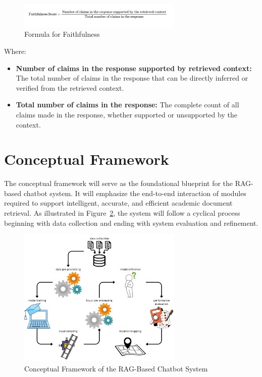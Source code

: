 \begin{refsection}

\begin{figure}[H]
\centering
\includegraphics[width=0.7\textwidth]{figures/faithfulness_formula.png}
\caption{Formula for Faithfulness}
\label{fig:faithfulness}
\end{figure}

\noindent Where:
\begin{itemize}
    \item \textbf{Number of claims in the response supported by retrieved context:} The total number of claims in the response that can be directly inferred or verified from the retrieved context.
    \item \textbf{Total number of claims in the response:} The complete count of all claims made in the response, whether supported or unsupported by the context.
\end{itemize}

\section{Conceptual Framework}

The conceptual framework will serve as the foundational blueprint for the RAG-based chatbot system. It will emphasize the end-to-end interaction of modules required to support intelligent, accurate, and efficient academic document retrieval. As illustrated in Figure~\ref{fig:conceptual_framework}, the system will follow a cyclical process beginning with data collection and ending with system evaluation and refinement.

\begin{figure}[H]
    \centering
    \includegraphics[width=0.7\textwidth]{figures/framework.png}
    \caption{Conceptual Framework of the RAG-Based Chatbot System}
    \label{fig:conceptual_framework}
\end{figure}


\end{refsection}
